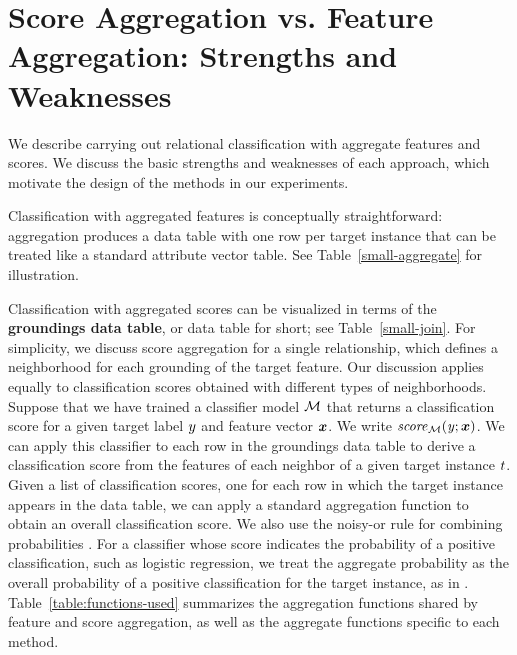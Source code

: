 \documentclass[conference]{IEEEtran}
\begin{document}
\section{Score Aggregation vs. Feature Aggregation: Strengths and Weaknesses} \label{sec:proscons} We describe carrying out relational classification with aggregate features and scores. We discuss the basic strengths and weaknesses of each approach, which motivate the design of the methods in our experiments.

Classification with aggregated features is conceptually straightforward: aggregation produces a data table with one row per target instance that can be treated like a standard attribute vector table. See Table~\ref{small-aggregate} for illustration.

Classification with aggregated scores can be visualized in terms of the \textbf{groundings data table}, or data table for short; see Table~\ref{small-join}. For simplicity, we discuss score aggregation for a single relationship, which defines a neighborhood for each grounding of the target feature. Our discussion applies equally to classification scores obtained with different types of neighborhoods.
%
Suppose that we have trained a classifier model $\mathcal{M}$ that returns a classification score for a given target label $y$ and feature vector $\boldsymbol{x}$. We write $\it{score}_{\mathcal{M}}(y;\boldsymbol{x})$. We can apply this classifier to each row in the groundings data table to derive a classification score from the features of each neighbor of a given target instance $t$.
%
Given a list of classification scores, one for each row in which the target instance appears in the data table, we can apply a standard aggregation function to obtain an overall classification score. We also use the noisy-or rule for combining probabilities \cite{Kersting2007}. For a classifier whose score indicates the probability of a positive classification, such as logistic regression, we treat the aggregate probability as the overall probability of a positive classification for the target instance, as in \cite{Neville2003}. 
Table~\ref{table:functions-used} summarizes the aggregation functions shared by feature and score aggregation, as well as the aggregate functions specific to each method.
%
\end{document}
